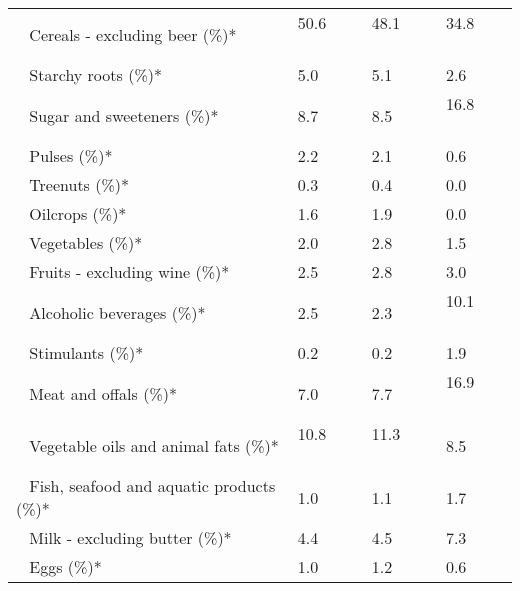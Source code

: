 \begin{tabular}{L{3.9cm} R{1cm} R{1cm} R{1cm}}
	 ~ Cereals - excluding beer (\%)* & 50.6 ~ \ \ & 48.1 ~ \ \ & 34.8 ~ \ \ \\ 
	 ~ Starchy roots (\%)* & 5.0 ~ \ \ & 5.1 ~ \ \ & 2.6 ~ \ \ \\ 
	 ~ Sugar and sweeteners (\%)* & 8.7 ~ \ \ & 8.5 ~ \ \ & 16.8 ~ \ \ \\ 
	 ~ Pulses (\%)* & 2.2 ~ \ \ & 2.1 ~ \ \ & 0.6 ~ \ \ \\ 
	 ~ Treenuts (\%)* & 0.3 ~ \ \ & 0.4 ~ \ \ & 0.0 ~ \ \ \\ 
	 ~ Oilcrops (\%)* & 1.6 ~ \ \ & 1.9 ~ \ \ & 0.0 ~ \ \ \\ 
	 ~ Vegetables (\%)* & 2.0 ~ \ \ & 2.8 ~ \ \ & 1.5 ~ \ \ \\ 
	 ~ Fruits - excluding wine (\%)* & 2.5 ~ \ \ & 2.8 ~ \ \ & 3.0 ~ \ \ \\ 
	 ~ Alcoholic beverages (\%)* & 2.5 ~ \ \ & 2.3 ~ \ \ & 10.1 ~ \ \ \\ 
	 ~ Stimulants (\%)* & 0.2 ~ \ \ & 0.2 ~ \ \ & 1.9 ~ \ \ \\ 
	 ~ Meat and offals (\%)* & 7.0 ~ \ \ & 7.7 ~ \ \ & 16.9 ~ \ \ \\ 
	 ~ Vegetable oils and animal fats (\%)* & 10.8 ~ \ \ & 11.3 ~ \ \ & 8.5 ~ \ \ \\ 
	 ~ Fish, seafood and aquatic products (\%)* & 1.0 ~ \ \ & 1.1 ~ \ \ & 1.7 ~ \ \ \\ 
	 ~ Milk - excluding butter (\%)* & 4.4 ~ \ \ & 4.5 ~ \ \ & 7.3 ~ \ \ \\ 
	 ~ Eggs (\%)* & 1.0 ~ \ \ & 1.2 ~ \ \ & 0.6 ~ \ \ \\ 
       \toprule
      \end{tabular}
      \clearpage
{}

